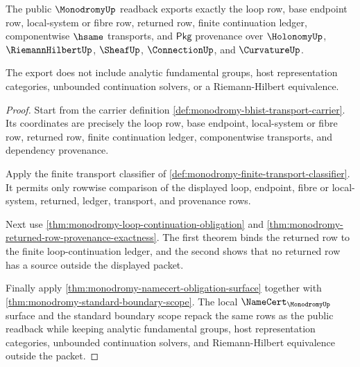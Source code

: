 \begin{theorem}
\label{thm:monodromy-public-loop-readback-export}
The public $\MonodromyUp$ readback exports exactly the loop row, base endpoint
row, local-system or fibre row, returned row, finite continuation ledger,
componentwise $\hsame$ transports, and $\mathsf{Pkg}$ provenance over
$\HolonomyUp$, $\RiemannHilbertUp$, $\SheafUp$, $\ConnectionUp$, and
$\CurvatureUp$.

The export does not include analytic fundamental groups, host representation
categories, unbounded continuation solvers, or a Riemann-Hilbert equivalence.
\end{theorem}
\begin{proof}
Start from the carrier definition
\autoref{def:monodromy-bhist-transport-carrier}. Its coordinates are precisely
the loop row, base endpoint, local-system or fibre row, returned row, finite
continuation ledger, componentwise transports, and dependency provenance.

Apply the finite transport classifier of
\autoref{def:monodromy-finite-transport-classifier}. It permits only rowwise
comparison of the displayed loop, endpoint, fibre or local-system, returned,
ledger, transport, and provenance rows.

Next use \autoref{thm:monodromy-loop-continuation-obligation} and
\autoref{thm:monodromy-returned-row-provenance-exactness}. The first theorem
binds the returned row to the finite loop-continuation ledger, and the second
shows that no returned row has a source outside the displayed packet.

Finally apply \autoref{thm:monodromy-namecert-obligation-surface} together
with \autoref{thm:monodromy-standard-boundary-scope}. The local
$\NameCert_{\MonodromyUp}$ surface and the standard boundary scope repack the
same rows as the public readback while keeping analytic fundamental groups,
host representation categories, unbounded continuation solvers, and
Riemann-Hilbert equivalence outside the packet.
\end{proof}

